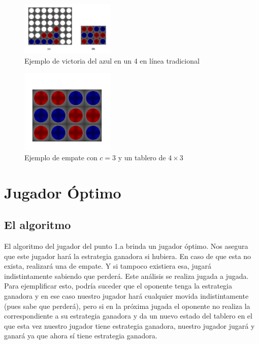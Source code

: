 \documentclass[A4paper,oneside,fleqn,11pt]{article}
\theoremstyle{definition}
\begin{document}
\begin{figure}
	\includegraphics[width=0.4\textwidth]{ejemplo_1.png}
	\caption{Ejemplo de victoria del azul en un 4 en línea tradicional}
\end{figure}

\begin{figure}
	\includegraphics[width=0.4\textwidth]{ejemplo_2.png}
	\caption{Ejemplo de empate con $c=3$ y un tablero de $4\times 3$}
\end{figure}


\section{Jugador Óptimo}

\subsection{El algoritmo}

El algoritmo del jugador del punto 1.a brinda un jugador óptimo. Nos asegura que este jugador hará la estrategia ganadora si hubiera. En caso de que esta no exista, realizará una de empate. Y si tampoco existiera esa, jugará indistintamente sabiendo que perderá. Este análisis se realiza jugada a jugada. Para ejemplificar esto, podría suceder que el oponente tenga la estrategia ganadora y en ese caso nuestro jugador hará cualquier movida indistintamente (pues sabe que perderá), pero si en la próxima jugada el oponente no realiza la correspondiente a su estrategia ganadora y da un nuevo estado del tablero en el que esta vez nuestro jugador tiene estrategia ganadora, nuestro jugador jugará y ganará ya que ahora sí tiene estrategia ganadora.
\end{document}
